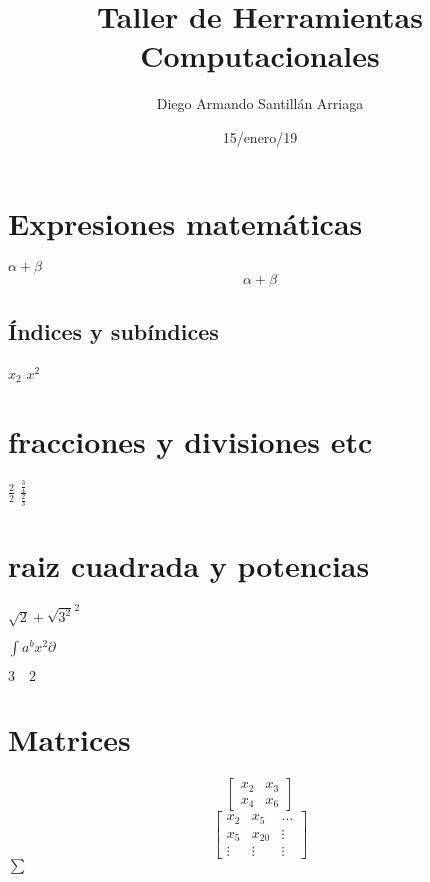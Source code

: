 \documentclass{article}
\title{\Huge Taller de Herramientas Computacionales}
\author {Diego Armando Santillán Arriaga}
\date{15/enero/19}
\begin{document}
\maketitle
	\begin{center}
	\end{center}
\newpage

\section*{Expresiones matemáticas}
$\alpha + \beta$\\ %
\[\alpha + \beta\] %

\subsection{Índices y subíndices}
$x_{2}$
$x^2$\\

\section{fracciones y divisiones etc}
$\frac{2}{2}$
$\frac{\frac{3}{4}}{\frac{2}{3}}$

\section{raiz cuadrada y potencias}
$\sqrt{2} + \sqrt{3^2}^2$

$\int {a}^{b} x^2 \partial$


$3 \quad 2$


\section*{Matrices}
\[
\begin{bmatrix}
x_{2} & x_{3}\\
x_{4} & x_{6}
\end{bmatrix}
\]
\[
\begin{bmatrix}
x_{2} & x_{5} & \dots\\
x_{5} & x_{20} &\vdots\\
\vdots & \vdots & \vdots
 
\end{bmatrix}\]
$\sum$
\end{document}

